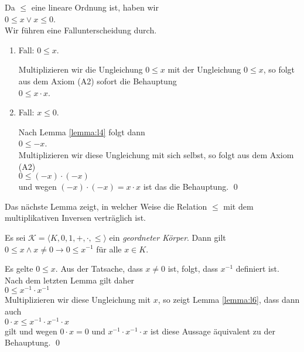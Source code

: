 \proof
Da $\leq$ eine lineare Ordnung ist, haben wir
\\[0.2cm]
\hspace*{1.3cm}
$0 \leq x \vee x \leq 0$.
\\[0.2cm] 
Wir f\"uhren eine Fallunterscheidung durch.
\begin{enumerate}
\item Fall: $0 \leq x$.

      Multiplizieren wir die Ungleichung $0 \leq x$ mit der Ungleichung $0 \leq x$, 
      so folgt aus dem Axiom (A2) sofort die Behauptung
      \\[0.2cm]
      \hspace*{1.3cm}
      $0 \leq x \cdot x$.
\item Fall: $x \leq 0$.

      Nach Lemma \ref{lemma:l4} folgt dann
      \\[0.2cm]
      \hspace*{1.3cm}
      $0 \leq -x$.
      \\[0.2cm]
      Multiplizieren wir diese Ungleichung mit sich selbst, so folgt aus dem Axiom (A2)
      \\[0.2cm]
      \hspace*{1.3cm}
      $0 \leq (-x) \cdot (-x)$
      \\[0.2cm]
      und wegen $(-x) \cdot (-x) = x \cdot x$ ist das die Behauptung.  \qed
\end{enumerate}

Das n\"achste Lemma zeigt, in welcher Weise die Relation $\leq$ mit dem multiplikativen Inversen
vertr\"aglich ist.

\begin{Lemma} 
  Es sei  $\mathcal{K} = \langle K, 0, 1, +, \cdot, \leq \rangle$ ein \emph{geordneter K\"orper}.
  Dann gilt
  \\[0.2cm]
  \hspace*{1.3cm} $0 \leq x \wedge x \not= 0 \rightarrow 0 \leq x^{-1}$
  \quad f\"ur alle $x \in K$.
\end{Lemma}

\proof
Es gelte $0 \leq x$.  Aus der Tatsache, dass $x \not= 0$ ist, folgt, dass $x^{-1}$ definiert ist.
Nach dem letzten Lemma gilt daher
\\[0.2cm]
\hspace*{1.3cm}
$0 \leq x^{-1} \cdot x^{-1}$ 
\\[0.2cm]
Multiplizieren wir diese Ungleichung mit $x$, so zeigt Lemma \ref{lemma:l6}, dass dann auch
\\[0.2cm]
\hspace*{1.3cm}
$0 \cdot x \leq x^{-1} \cdot x^{-1} \cdot x$
\\[0.2cm]
gilt und wegen $0 \cdot x = 0$ und $x^{-1} \cdot x^{-1} \cdot x$ ist diese Aussage
\"aquivalent zu der Behauptung. \qed

